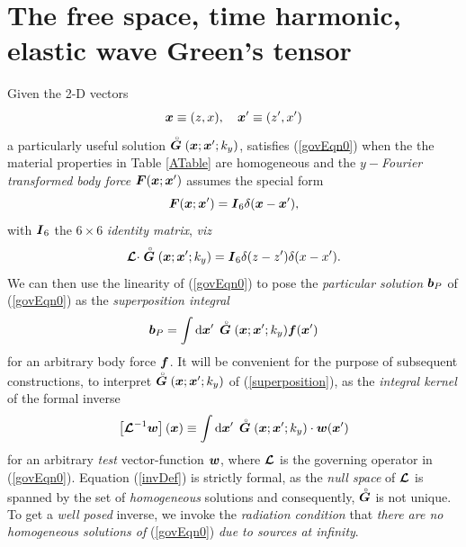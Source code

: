 

\section{The free space, time harmonic,  elastic wave Green's tensor} \label{classpwprop}
Given the 2-D vectors
\[
{\bmi  x}\equiv (z,x), \quad {\bmi  x}^{\prime}\equiv (z^{\prime},x^{\prime})
\]
a particularly useful solution $\rf{\bmi  G }({\bmi  x};{\bmi  x}^{\prime};k_y)$, 
satisfies (\ref{govEqn0}) 	when the the material properties in 
Table \ref{ATable} are homogeneous and the  {\em $y-$Fourier transformed body 
force\/} ${\bmi F}({\bmi x};{\bmi x}^{\prime})$ assumes the 
special form 
\[
{\bmi F}({\bmi x};{\bmi x}^{\prime})=
{\bmi  I}_6 \delta({\bmi x}-{\bmi x}^{\prime}),
\] 
with ${\bmi  I}_6$ the $6 \times 6$ {\em identity matrix\/}, {\em viz\/}
\begin{equation} \label{(2.1.6)} 
{{\CB L}}\cdot \rf{\bmi  G}({\bmi  x};{\bmi  x}^{\prime};k_y)={\bmi  I}_6 
\delta({z}-{z}^{\prime})\delta({x}-{x}^{\prime}).
\end{equation}
We can then use the linearity of (\ref{govEqn0}) to pose the {\em 
particular solution\/} ${\bmi  b}_{P}$ of (\ref{govEqn0}) as the {\em 
superposition integral\/}
\begin{equation}	\label{superposition}
	{\bmi  b}_{P}=\int {\rm d}{\bmi  x}^{\prime}\, \rf{\bmi  G}({\bmi  x};{\bmi 
x}^{\prime};k_y){\bmi 
	f}({\bmi  x}^{\prime})
\end{equation}
for an arbitrary body force $\bmi  f$.
It will be  convenient for the purpose of subsequent constructions, to 
interpret 
$\rf{\bmi  G}({\bmi  x};{\bmi  x}^{\prime};k_y)$  of (\ref{superposition}), as the 
{\em integral kernel\/} of the formal inverse
\begin{equation}	\label{invDef}
	\left[{{\CB L}}^{-1} {\bmi  w}\right]({\bmi  x})\equiv \int {\rm d}{\bmi 
	x}^{\prime}\, \rf{\bmi  G }({\bmi  x};{\bmi  x}^{\prime};k_y)\cdot{\bmi  w}({\bmi 
x}^{\prime}) 
\end{equation}
for an arbitrary {\em test\/} vector-function $\bmi  w$, where ${{\CB L}}$ is the governing 
operator in (\ref{govEqn0}). Equation 
(\ref{invDef}) is strictly formal,  as the {\em null space\/} of 
${{\CB L}}$ is spanned by the set of {\em homogeneous\/} solutions and 
consequently, 
$\rf{\bmi  G}$ is not unique. To get a {\em well posed\/} inverse, we invoke 
the {\em radiation condition\/} that {\em there are no homogeneous 
solutions 
of\/} (\ref{govEqn0}) {\em due to sources at infinity\/}.



